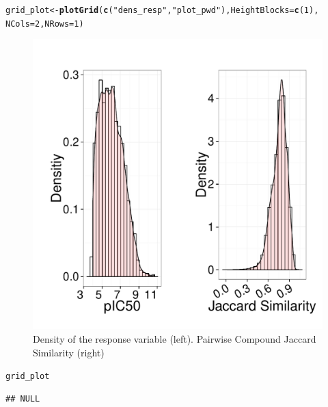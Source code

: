 \documentclass[twoside,a4wide,12pt]{article}\usepackage[]{graphicx}\usepackage[]{color}
\makeatletter
\def\maxwidth{ %
  \ifdim\Gin@nat@width>\linewidth
    \linewidth
  \else
    \Gin@nat@width
  \fi
}
\newcommand{\hlnum}[1]{\textcolor[rgb]{0.686,0.059,0.569}{#1}}%
\newcommand{\hlstr}[1]{\textcolor[rgb]{0.192,0.494,0.8}{#1}}%
\newcommand{\hlstd}[1]{\textcolor[rgb]{0.345,0.345,0.345}{#1}}%
\newcommand{\hlkwb}[1]{\textcolor[rgb]{0.69,0.353,0.396}{#1}}%
\newcommand{\hlkwc}[1]{\textcolor[rgb]{0.333,0.667,0.333}{#1}}%
\newcommand{\hlkwd}[1]{\textcolor[rgb]{0.737,0.353,0.396}{\textbf{#1}}}%
\newenvironment{kframe}{%
 \def\at@end@of@kframe{}%
 \ifinner\ifhmode%
  \def\at@end@of@kframe{\end{minipage}}%
  \begin{minipage}{\columnwidth}%
 \fi\fi%
 \def\FrameCommand##1{\hskip\@totalleftmargin \hskip-\fboxsep
 \colorbox{shadecolor}{##1}\hskip-\fboxsep
     \hskip-\linewidth \hskip-\@totalleftmargin \hskip\columnwidth}%
 \MakeFramed {\advance\hsize-\width
   \@totalleftmargin\z@ \linewidth\hsize
   \@setminipage}}%
 {\par\unskip\endMakeFramed%
 \at@end@of@kframe}
\newenvironment{knitrout}{}{} %
\makeatother
\begin{document}
\begin{knitrout}
\color{fgcolor}\begin{kframe}
\begin{alltt}
\hlstd{grid_plot} \hlkwb{<-} \hlkwd{plotGrid}\hlstd{(}\hlkwd{c}\hlstd{(}\hlstr{"dens_resp"}\hlstd{,} \hlstr{"plot_pwd"}\hlstd{),} \hlkwc{HeightBlocks} \hlstd{=} \hlkwd{c}\hlstd{(}\hlnum{1}\hlstd{),}
    \hlkwc{NCols} \hlstd{=} \hlnum{2}\hlstd{,} \hlkwc{NRows} \hlstd{=} \hlnum{1}\hlstd{)}
\end{alltt}
\end{kframe}\begin{figure}[]


{\centering \includegraphics[width=\maxwidth,angle=90]{figure/unnamed-chunk-18} 

}

\caption[Density of the response variable (left)]{Density of the response variable (left). Pairwise Compound Jaccard Similarity (right)\label{fig:unnamed-chunk-18}}
\end{figure}

\begin{kframe}\begin{alltt}
\hlstd{grid_plot}
\end{alltt}
\begin{verbatim}
## NULL
\end{verbatim}
\end{kframe}
\end{knitrout}
\end{document}
